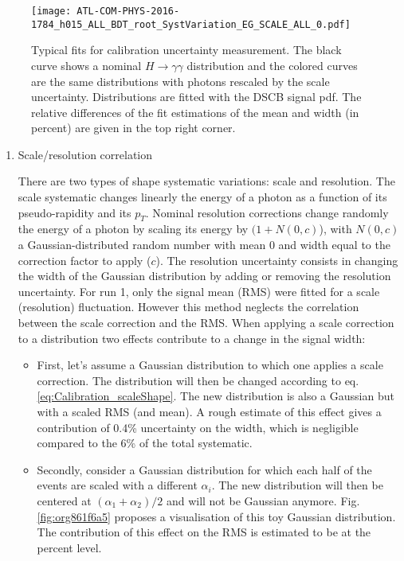 \begin{enumerate}
\begin{figure}[htbp]
\centering
\texttt{[image: ATL-COM-PHYS-2016-1784\_h015\_ALL\_BDT\_root\_SystVariation\_EG\_SCALE\_ALL\_0.pdf]}
\caption{\label{fig:org356a158}
  Typical fits for calibration uncertainty measurement.
  The black curve shows a nominal $H\rightarrow\gamma\gamma$ distribution and the colored curves are the same distributions with photons rescaled by the scale uncertainty.
  Distributions are fitted with the DSCB signal pdf.
  The relative differences of the fit estimations of the mean and width (in percent) are given in the top right corner.}
\end{figure}

\begin{enumerate}
\item Scale/resolution correlation
\label{sec:orgacf66e0}
\label{sec:syst_shape_massResCorr}

There are two types of shape systematic variations: scale and resolution.
The scale systematic changes linearly the energy of a photon as a function of its pseudo-rapidity and its \(p_T\).
Nominal resolution corrections change randomly the energy of a photon by scaling its energy by \((1+N(0,c)\)), with \(N(0,c)\) a Gaussian-distributed random number with mean 0 and width equal to the correction factor to apply (\(c\)).
The resolution uncertainty consists in changing the width of the Gaussian distribution by adding or removing the resolution uncertainty.
For run 1, only the signal mean (RMS) were fitted for a scale (resolution) fluctuation.
However this method neglects the correlation between the scale correction and the RMS.
When applying a scale correction to a distribution two effects contribute to a change in the signal width:

\begin{itemize}
\item First, let's assume a Gaussian distribution to which one applies a scale correction.
The distribution will then be changed according to eq. \ref{eq:Calibration_scaleShape}.
The new distribution is also a Gaussian but  with a scaled RMS (and mean).
A rough estimate of this effect gives a contribution of 0.4\% uncertainty on the width, which is negligible compared to the 6\% of the total systematic.
\end{itemize}


\begin{itemize}
\item Secondly, consider a Gaussian distribution for which each half of the events are scaled with a different \(\alpha_i\).
The new distribution will then be centered at \((\alpha_1+\alpha_2)/2\) and will not be Gaussian anymore.
Fig. \ref{fig:org861f6a5} proposes a visualisation of this toy Gaussian distribution.
The contribution of this effect on the RMS is estimated to be at the percent level.
\end{itemize}


\end{enumerate}
\end{enumerate}
